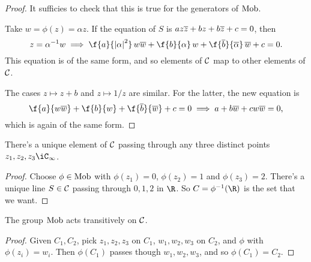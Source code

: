 \begin{proof}
	It sufficies to check that this is true for the generators of $\operatorname{Mob}$.

	Take $w=\phi(z)=\alpha z$. If the equation of $S$ is $az\overline{z} + bz+b\overline{z} + c = 0$, then
	\begin{equation*}
		z = \alpha^{-1} w \implies
		\f{a}{\left\vert \alpha \right\vert^2}\,w\wbar + \f{b}{\alpha}\,w + \f{\overline{b}}{\overline{\alpha}}\,\wbar + c = 0.
	\end{equation*}
	This equation is of the same form, and so elements of $\cal{C}$ map to other elements of $\cal{C}$.

	The cases $z\mapsto z+b$ and $z\mapsto 1/z$ are similar. For the latter, the new equation is
	\begin{equation*}
		\f{a}{w\wbar} + \f{b}{w} + \f{\overline{b}}{\wbar} + c = 0 \implies a + b\wbar + cw\wbar = 0,
	\end{equation*}
	which is again of the same form.
\end{proof}

\begin{corollary}
	There's a unique element of $\cal{C}$ passing through any three distinct points $z_1,z_2,z_3\iC_\infty$.
\end{corollary}

\begin{proof}
	Choose $\phi\in\operatorname{Mob}$ with $\phi(z_1)=0$, $\phi(z_2)=1$ and $\phi(z_3)=2$. There's a unique line $S\in\cal{C}$ passing through $0,1,2$ in $\R$. So $C=\phi^{-1}(\R)$ is the set that we want.
\end{proof}

\begin{corollary}
	The group $\operatorname{Mob}$ acts transitively on $\cal{C}$.
\end{corollary}

\begin{proof}
	 Given $C_1,C_2$, pick $z_1,z_2,z_3$ on $C_1$, $w_1,w_2,w_3$ on $C_2$, and $\phi$ with $\phi(z_i) = w_i$. Then $\phi(C_1)$ passes though $w_1,w_2,w_3$, and so $\phi(C_1)=C_2$.
\end{proof}

